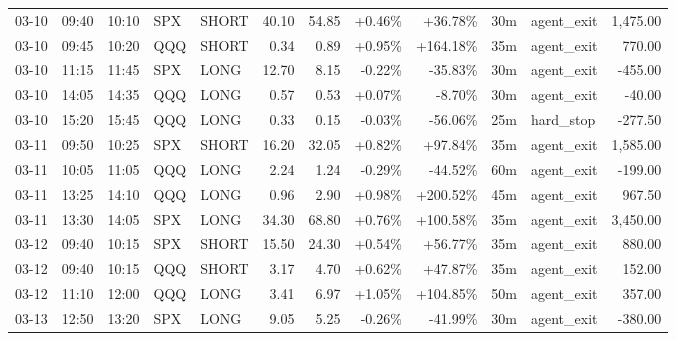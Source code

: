 \documentclass[11pt,a4paper,twoside]{article}
\begin{document}
\begin{center}
\begin{longtable}{>{\color{txtmain}}l l l l l r r r r r >{\color{txtmain}}l r}
03-10 & 09:40 & 10:10 & SPX & SHORT & 40.10 & 54.85 & \textcolor{wingreen}{+0.46\%} & \textcolor{wingreen}{+36.78\%} & 30m & agent\_exit & \textcolor{wingreen}{1,475.00} \\
03-10 & 09:45 & 10:20 & QQQ & SHORT & 0.34 & 0.89 & \textcolor{wingreen}{+0.95\%} & \textcolor{wingreen}{+164.18\%} & 35m & agent\_exit & \textcolor{wingreen}{770.00} \\
03-10 & 11:15 & 11:45 & SPX & LONG & 12.70 & 8.15 & \textcolor{lossred}{-0.22\%} & \textcolor{lossred}{-35.83\%} & 30m & agent\_exit & \textcolor{lossred}{-455.00} \\
03-10 & 14:05 & 14:35 & QQQ & LONG & 0.57 & 0.53 & \textcolor{wingreen}{+0.07\%} & \textcolor{lossred}{-8.70\%} & 30m & agent\_exit & \textcolor{lossred}{-40.00} \\
03-10 & 15:20 & 15:45 & QQQ & LONG & 0.33 & 0.15 & \textcolor{lossred}{-0.03\%} & \textcolor{lossred}{-56.06\%} & 25m & hard\_stop & \textcolor{lossred}{-277.50} \\
03-11 & 09:50 & 10:25 & SPX & SHORT & 16.20 & 32.05 & \textcolor{wingreen}{+0.82\%} & \textcolor{wingreen}{+97.84\%} & 35m & agent\_exit & \textcolor{wingreen}{1,585.00} \\
03-11 & 10:05 & 11:05 & QQQ & LONG & 2.24 & 1.24 & \textcolor{lossred}{-0.29\%} & \textcolor{lossred}{-44.52\%} & 60m & agent\_exit & \textcolor{lossred}{-199.00} \\
03-11 & 13:25 & 14:10 & QQQ & LONG & 0.96 & 2.90 & \textcolor{wingreen}{+0.98\%} & \textcolor{wingreen}{+200.52\%} & 45m & agent\_exit & \textcolor{wingreen}{967.50} \\
03-11 & 13:30 & 14:05 & SPX & LONG & 34.30 & 68.80 & \textcolor{wingreen}{+0.76\%} & \textcolor{wingreen}{+100.58\%} & 35m & agent\_exit & \textcolor{wingreen}{3,450.00} \\
03-12 & 09:40 & 10:15 & SPX & SHORT & 15.50 & 24.30 & \textcolor{wingreen}{+0.54\%} & \textcolor{wingreen}{+56.77\%} & 35m & agent\_exit & \textcolor{wingreen}{880.00} \\
03-12 & 09:40 & 10:15 & QQQ & SHORT & 3.17 & 4.70 & \textcolor{wingreen}{+0.62\%} & \textcolor{wingreen}{+47.87\%} & 35m & agent\_exit & \textcolor{wingreen}{152.00} \\
03-12 & 11:10 & 12:00 & QQQ & LONG & 3.41 & 6.97 & \textcolor{wingreen}{+1.05\%} & \textcolor{wingreen}{+104.85\%} & 50m & agent\_exit & \textcolor{wingreen}{357.00} \\
03-13 & 12:50 & 13:20 & SPX & LONG & 9.05 & 5.25 & \textcolor{lossred}{-0.26\%} & \textcolor{lossred}{-41.99\%} & 30m & agent\_exit & \textcolor{lossred}{-380.00} \\

\end{longtable}
\end{center}
\end{document}
